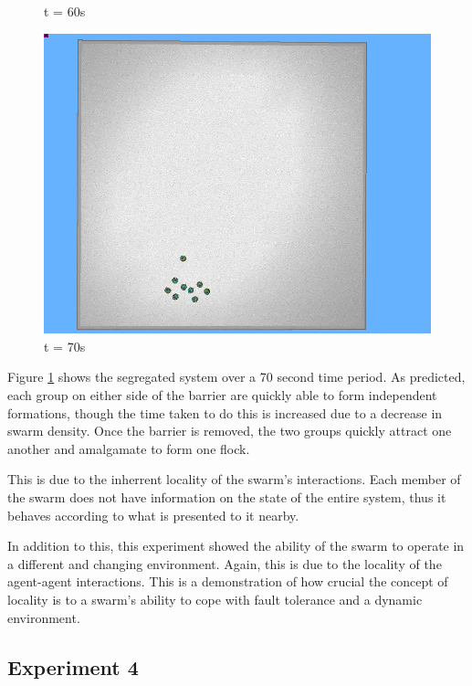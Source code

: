 \begin{figure}[!h]
\begin{minipage}{.5\textwidth}
		\caption*{t = 60s}
		\label{fig:seg3}
	\end{minipage}%
	\begin{minipage}{.5\textwidth}
	\centering
	\includegraphics[width=.75\linewidth]{segregate4}
	\caption*{t = 70s}
	\label{fig:seg4}
\end{minipage}%
	\label{fig:seg}
\end{figure}

Figure \ref{fig:seg} shows the segregated system over a 70 second time period. As predicted, each group on either side of the barrier are quickly able to form independent formations, though the  time taken to do this is increased due to a decrease in swarm density. Once the barrier is removed, the two groups quickly attract one another and amalgamate to form one flock.

This is due to the inherrent locality of the swarm's interactions. Each member of the swarm does not have information on the state of the entire system, thus it behaves according to what is presented to it nearby.

In addition to this, this experiment showed the ability of the swarm to operate in a different and changing environment. Again, this is due to the locality of the agent-agent interactions. This is a demonstration of how crucial the concept of locality is to a swarm's ability to cope with fault tolerance and a dynamic environment.
\clearpage

\subsection{Experiment 4}

